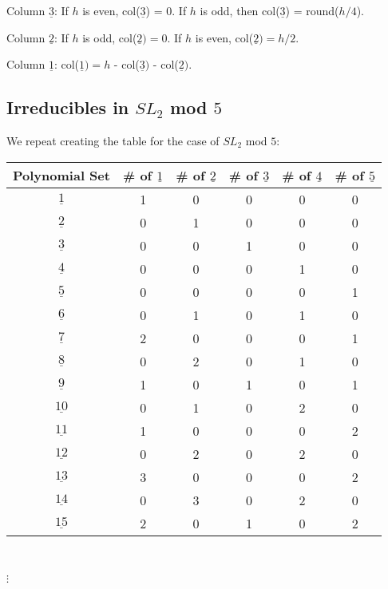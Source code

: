 \documentclass[a4paper,draft]{amsproc}
\theoremstyle{plain}
\theoremstyle{definition}
\theoremstyle{remark}
\numberwithin{equation}{section}
\begin{document}
Column $\underline{3}$: If $h$ is even, col($\underline{3}$) = 0. If $h$ is odd, then col($\underline{3}$) = round($h/4$). 

Column $\underline{2}$: If $h$ is odd, col($\underline{2}) = 0$. If $h$ is even, col($\underline{2}) = h/2$. 

Column $\underline{1}$: col($\underline{1}) = h$ - col($\underline{3})$ - col($\underline{2})$. 

\subsection{Irreducibles in $SL_{2}$ mod $5$}
We repeat creating the table for the case of $SL_{2}$ mod $5$: 
\begin{table}[h]
\begin{tabular}{|c|c|c|c|c|c|}
\hline
Polynomial Set & \# of $\underline{1}$ & \# of $\underline{2}$ & \# of $\underline{3}$ & \# of $\underline{4}$ & \# of $\underline{5}$ \\ \hline

$\underline{1}$              & 1       & 0       & 0     & 0  & 0 \\ \hline
$\underline{2}$              & 0       & 1       & 0     & 0  & 0 \\ \hline
$\underline{3}$              & 0       & 0       & 1     & 0  & 0  \\ \hline
$\underline{4}$              & 0       & 0       & 0     & 1  & 0  \\ \hline
$\underline{5}$              & 0       & 0       & 0     & 0  & 1  \\ \hline
$\underline{6}$              & 0       & 1       & 0     & 1  & 0   \\ \hline
$\underline{7}$              & 2       & 0       & 0     & 0  & 1   \\ \hline
$\underline{8}$              & 0       & 2       & 0     & 1  & 0   \\ \hline
$\underline{9}$               & 1      & 0       & 1     & 0  & 1   \\ \hline
$\underline{10}$             & 0       & 1       & 0    & 2  & 0    \\ \hline
$\underline{11}$             & 1       & 0       & 0    & 0  & 2    \\ \hline
$\underline{12}$             & 0       & 2       & 0    & 2  & 0    \\ \hline
$\underline{13}$             & 3       & 0       & 0    & 0  & 2    \\ \hline
$\underline{14}$             & 0       & 3       & 0    & 2  & 0    \\ \hline
$\underline{15}$             & 2       & 0       & 1    & 0  & 2    \\ \hline
\end{tabular} \\
\begin{centering}$\vdots$\end{centering}
\end{table}
\end{document}
